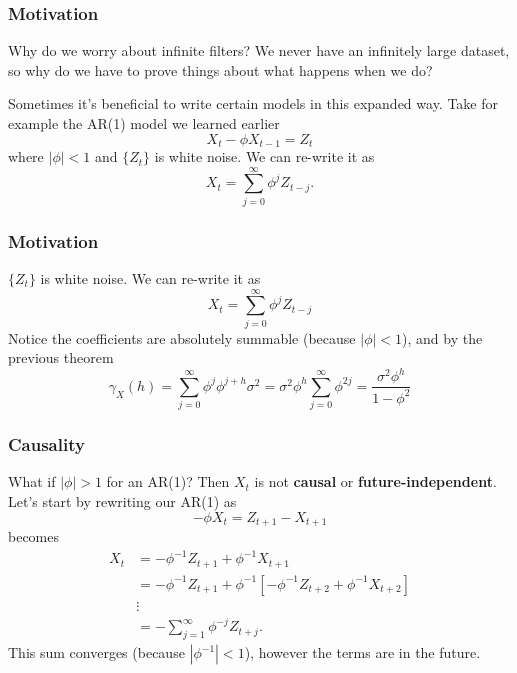\documentclass{beamer}
\begin{document}

\begin{frame}
\frametitle{Motivation}

Why do we worry about infinite filters? We never have an infinitely large dataset, so why do we have to prove things about what happens when we do?
\newline

Sometimes it's beneficial to write certain models in this expanded way. Take for example the AR(1) model we learned earlier
\[
X_t - \phi X_{t-1} = Z_t
\]
where $|\phi| < 1$ and $\{Z_t\}$ is white noise. We can re-write it as
\[
X_t = \sum_{j=0}^{\infty} \phi^j Z_{t-j}.
\]

\end{frame}

\begin{frame}
\frametitle{Motivation}

$\{Z_t\}$ is white noise. We can re-write it as
\[
X_t = \sum_{j=0}^{\infty} \phi^j Z_{t-j}
\]
Notice the coefficients are absolutely summable (because $|\phi| < 1$), and by the previous theorem
\[
\gamma_X(h) = \sum_{j=0}^{\infty}\phi^j\phi^{j+h} \sigma^2 = \sigma^2\phi^h \sum_{j=0}^{\infty}\phi^{2j} = \frac{\sigma^2\phi^h}{1-\phi^2}
\]
\end{frame}


\begin{frame}
\frametitle{Causality}

What if $|\phi|>1$ for an AR(1)? Then $X_t$ is not {\bf causal} or {\bf future-independent}. Let's start by rewriting our AR(1) as
\[
- \phi X_{t} = Z_{t+1} - X_{t+1} 
\]
becomes
\begin{align*}
X_t &= -\phi^{-1}Z_{t+1} + \phi^{-1} X_{t+1} \\
&=  -\phi^{-1}Z_{t+1} + \phi^{-1} [-\phi^{-1}Z_{t+2} + \phi^{-1} X_{t+2} ] \\
&\vdots \\
&= -\sum_{j=1}^{\infty} \phi^{-j} Z_{t+j}.
\end{align*}
This sum converges (because $|\phi^{-1}| < 1$), however the terms are in the future.
\end{frame}

\end{document}
